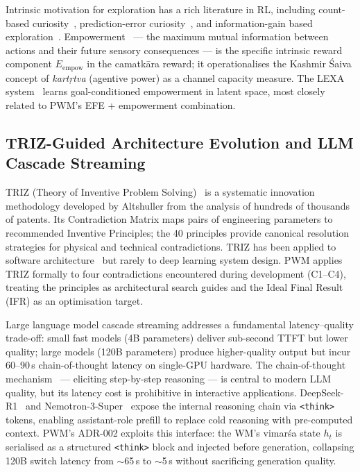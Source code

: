 \documentclass[journal,onecolumn,11pt]{IEEEtran}
\begin{document}
Intrinsic motivation for exploration has a rich literature in RL, including
count-based curiosity~\cite{bellemare2016unifying},
prediction-error curiosity~\cite{pathak2017curiosity},
and information-gain based
exploration~\cite{itti2009bayesian,still2012information}.
Empowerment~\cite{klyubin2005empowerment,salge2014empowerment} — the maximum
mutual information between actions and their future sensory consequences — is the
specific intrinsic reward component $E_{\text{empow}}$ in the camatkāra reward;
it operationalises the Kashmir Śaiva concept of \emph{kartṛtva} (agentive power)
as a channel capacity measure.
The LEXA system~\cite{mendonca2021discovering} learns goal-conditioned empowerment
in latent space, most closely related to PWM's EFE + empowerment combination.

\subsection{TRIZ-Guided Architecture Evolution and LLM Cascade Streaming}

TRIZ (Theory of Inventive Problem Solving)~\cite{altshuller1996innovinnovation,savransky2000engineering}
is a systematic innovation methodology developed by Altshuller from the analysis of
hundreds of thousands of patents. Its Contradiction Matrix maps pairs of
engineering parameters to recommended Inventive Principles; the 40 principles
provide canonical resolution strategies for physical and technical contradictions.
TRIZ has been applied to software
architecture~\cite{savransky2000engineering} but rarely to deep learning system
design. PWM applies TRIZ formally to four contradictions encountered during
development (C1–C4), treating the principles as architectural search guides and
the Ideal Final Result (IFR) as an optimisation target.

Large language model cascade streaming addresses a fundamental latency--quality
trade-off: small fast models (4B parameters) deliver sub-second TTFT but lower
quality; large models (120B parameters) produce higher-quality output but incur
60--90\,s chain-of-thought latency on single-GPU hardware.
The chain-of-thought mechanism~\cite{wei2022cot} — eliciting step-by-step
reasoning — is central to modern LLM quality, but its latency cost is
prohibitive in interactive applications.
DeepSeek-R1~\cite{guo2025deepseek} and Nemotron-3-Super~\cite{nemotron2024} expose
the internal reasoning chain via \texttt{<think>} tokens, enabling assistant-role
prefill to replace cold reasoning with pre-computed context.
PWM's ADR-002 exploits this interface: the WM's vimarśa state $h_t$ is serialised
as a structured \texttt{<think>} block and injected before generation, collapsing
120B switch latency from $\sim$65\,s to $\sim$5\,s without sacrificing generation
quality.
\end{document}

